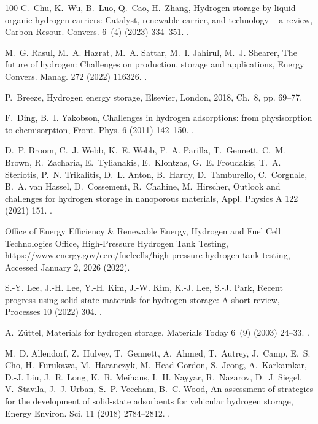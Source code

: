 \documentclass[review]{elsarticle}
\begin{document}
\begin{thebibliography}{100}
C.~Chu, K.~Wu, B.~Luo, Q.~Cao, H.~Zhang, Hydrogen storage by liquid organic
  hydrogen carriers: Catalyst, renewable carrier, and technology – a review,
  Carbon Resour. Convers. 6~(4) (2023) 334--351.
\newblock \href {https://doi.org/10.1016/j.crcon.2023.03.007}
  {}.

M.~G. Rasul, M.~A. Hazrat, M.~A. Sattar, M.~I. Jahirul, M.~J. Shearer, The
  future of hydrogen: Challenges on production, storage and applications,
  Energy Convers. Manag. 272 (2022) 116326.
\newblock \href {https://doi.org/10.1016/j.enconman.2022.116326}
  {}.

P.~Breeze, Hydrogen energy storage, Elsevier, London, 2018, Ch.~8, pp. 69--77.

F.~Ding, B.~I. Yakobson, Challenges in hydrogen adsorptions: from physisorption
  to chemisorption, Front. Phys. 6 (2011) 142--150.
\newblock \href {https://doi.org/10.1007/s11467-011-0171-6}
  {}.

D.~P. Broom, C.~J. Webb, K.~E. Webb, P.~A. Parilla, T.~Gennett, C.~M. Brown,
  R.~Zacharia, E.~Tylianakis, E.~Klontzas, G.~E. Froudakis, T.~A. Steriotis,
  P.~N. Trikalitis, D.~L. Anton, B.~Hardy, D.~Tamburello, C.~Corgnale, B.~A.
  van Hassel, D.~Cossement, R.~Chahine, M.~Hirscher, Outlook and challenges for
  hydrogen storage in nanoporous materials, Appl. Physics A 122 (2021) 151.
\newblock \href {https://doi.org/10.1007/s00339-016-9651-4}
  {}.

{Office of Energy Efficiency \& Renewable Energy, Hydrogen and Fuel Cell
  Technologies Office}, {High-Pressure Hydrogen Tank Testing},
  https://www.energy.gov/eere/fuelcells/high-pressure-hydrogen-tank-testing,
  {Accessed January 2, 2026} (2022).

S.-Y. Lee, J.-H. Lee, Y.-H. Kim, J.-W. Kim, K.-J. Lee, S.-J. Park, Recent
  progress using solid-state materials for hydrogen storage: A short review,
  Processes 10 (2022) 304.
\newblock \href {https://doi.org/10.3390/pr10020304}
  {}.

A.~Z{\"u}ttel, Materials for hydrogen storage, Materials Today 6~(9) (2003)
  24--33.
\newblock \href {https://doi.org/10.1016/S1369-7021(03)00922-2}
  {}.

M.~D. Allendorf, Z.~Hulvey, T.~Gennett, A.~Ahmed, T.~Autrey, J.~Camp, E.~S.
  Cho, H.~Furukawa, M.~Haranczyk, M.~Head-Gordon, S.~Jeong, A.~Karkamkar, D.-J.
  Liu, J.~R. Long, K.~R. Meihaus, I.~H. Nayyar, R.~Nazarov, D.~J. Siegel,
  V.~Stavila, J.~J. Urban, S.~P. Veccham, B.~C. Wood, An assessment of
  strategies for the development of solid-state adsorbents for vehicular
  hydrogen storage, Energy Environ. Sci. 11 (2018) 2784--2812.
\newblock \href {https://doi.org/10.1039/C8EE01085D}
  {}.


\end{thebibliography}
\end{document}
